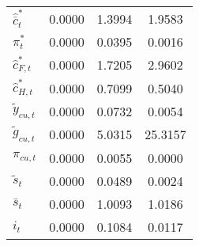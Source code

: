 \begin{center}
\begin{longtable}{lccc}
${\hat {\bar c}_t^*}  $	 & 	       0.0000	 & 	       1.3994	 & 	       1.9583 \\ 
${\pi_t^*}            $	 & 	       0.0000	 & 	       0.0395	 & 	       0.0016 \\ 
${\hat c_{F,t}^*}     $	 & 	       0.0000	 & 	       1.7205	 & 	       2.9602 \\ 
${\hat c_{H,t}^*}     $	 & 	       0.0000	 & 	       0.7099	 & 	       0.5040 \\ 
${\tilde y_{cu,t}}    $	 & 	       0.0000	 & 	       0.0732	 & 	       0.0054 \\ 
${\tilde g_{cu,t}}    $	 & 	       0.0000	 & 	       5.0315	 & 	      25.3157 \\ 
${\pi_{cu,t}}         $	 & 	       0.0000	 & 	       0.0055	 & 	       0.0000 \\ 
${\tilde s_t}         $	 & 	       0.0000	 & 	       0.0489	 & 	       0.0024 \\ 
${\bar s_t}           $	 & 	       0.0000	 & 	       1.0093	 & 	       1.0186 \\ 
${i_t}                $	 & 	       0.0000	 & 	       0.1084	 & 	       0.0117 \\ 
\end{longtable}
 \end{center}
